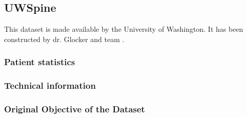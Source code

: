 \subsection{UWSpine}

This dataset is made available by the University of Washington.
It has been constructed by dr. Glocker and team \cite{Glocker2012,Glocker2013}.

\subsubsection{Patient statistics}




\subsubsection{Technical information}

\subsubsection{Original Objective of the Dataset}